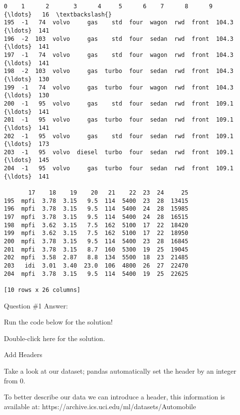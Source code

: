 \documentclass[11pt]{article}
\makeatletter
\newcommand{\boxspacing}{\kern\kvtcb@left@rule\kern\kvtcb@boxsep}
\newcommand{\prompt}[4]{
        \ttfamily\llap{{\color{#2}[#3]:\hspace{3pt}#4}}\vspace{-\baselineskip}
    }
\makeatother
\begin{document}
            \begin{tcolorbox}[breakable, size=fbox, boxrule=.5pt, pad at break*=1mm, opacityfill=0]
\prompt{Out}{outcolor}{4}{\boxspacing}
\begin{Verbatim}[commandchars=\\\{\}]
     0    1      2       3      4     5      6    7      8      9   {\ldots}   16  \textbackslash{}
195  -1   74  volvo     gas    std  four  wagon  rwd  front  104.3  {\ldots}  141
196  -2  103  volvo     gas    std  four  sedan  rwd  front  104.3  {\ldots}  141
197  -1   74  volvo     gas    std  four  wagon  rwd  front  104.3  {\ldots}  141
198  -2  103  volvo     gas  turbo  four  sedan  rwd  front  104.3  {\ldots}  130
199  -1   74  volvo     gas  turbo  four  wagon  rwd  front  104.3  {\ldots}  130
200  -1   95  volvo     gas    std  four  sedan  rwd  front  109.1  {\ldots}  141
201  -1   95  volvo     gas  turbo  four  sedan  rwd  front  109.1  {\ldots}  141
202  -1   95  volvo     gas    std  four  sedan  rwd  front  109.1  {\ldots}  173
203  -1   95  volvo  diesel  turbo  four  sedan  rwd  front  109.1  {\ldots}  145
204  -1   95  volvo     gas  turbo  four  sedan  rwd  front  109.1  {\ldots}  141

       17    18    19    20   21    22  23  24     25
195  mpfi  3.78  3.15   9.5  114  5400  23  28  13415
196  mpfi  3.78  3.15   9.5  114  5400  24  28  15985
197  mpfi  3.78  3.15   9.5  114  5400  24  28  16515
198  mpfi  3.62  3.15   7.5  162  5100  17  22  18420
199  mpfi  3.62  3.15   7.5  162  5100  17  22  18950
200  mpfi  3.78  3.15   9.5  114  5400  23  28  16845
201  mpfi  3.78  3.15   8.7  160  5300  19  25  19045
202  mpfi  3.58  2.87   8.8  134  5500  18  23  21485
203   idi  3.01  3.40  23.0  106  4800  26  27  22470
204  mpfi  3.78  3.15   9.5  114  5400  19  25  22625

[10 rows x 26 columns]
\end{Verbatim}
\end{tcolorbox}
        
    Question \#1 Answer:

Run the code below for the solution!

    Double-click here for the solution.

    Add Headers

Take a look at our dataset; pandas automatically set the header by an
integer from 0.

To better describe our data we can introduce a header, this information
is available at: https://archive.ics.uci.edu/ml/datasets/Automobile
\end{document}
